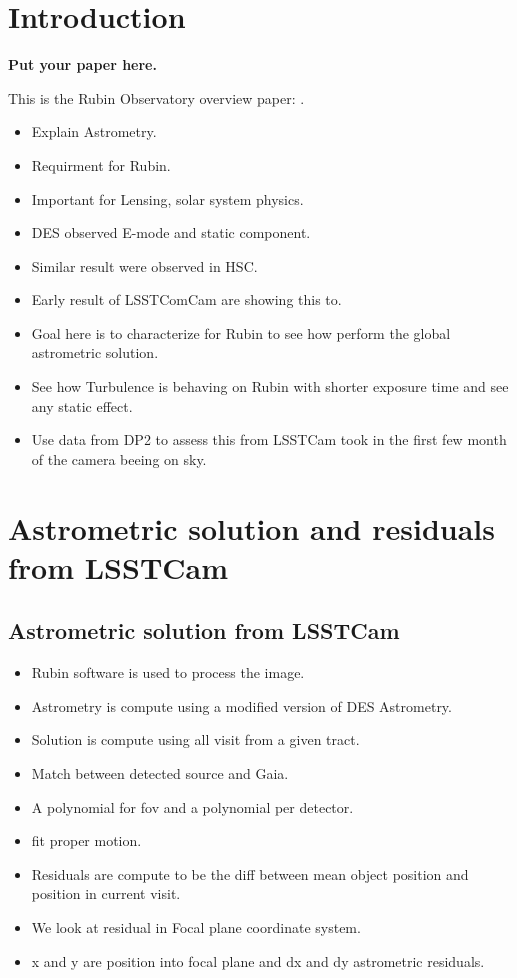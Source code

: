 \section{Introduction}

\textbf{Put your paper here.}
\vskip 0.4in

This is the Rubin Observatory overview paper: \citet{2019ApJ...873..111I}.

\begin{itemize}
    \item Explain Astrometry.
    \item Requirment for Rubin.
    \item Important for Lensing, solar system physics.
    \item DES observed E-mode and static component.
    \item Similar result were observed in HSC.
    \item Early result of LSSTComCam are showing this to. 
    \item Goal here is to characterize for Rubin to see how perform the global astrometric solution.
    \item See how Turbulence is behaving on Rubin with shorter exposure time and see any static effect.
    \item Use data from DP2 to assess this from LSSTCam took in the first few month of the camera beeing on sky.
\end{itemize}


\section{Astrometric solution and residuals from LSSTCam}

\subsection{Astrometric solution from LSSTCam}

\begin{itemize}
    \item Rubin software is used to process the image.
    \item Astrometry is compute using a modified version of DES Astrometry.
    \item Solution is compute using all visit from a given tract.
    \item Match between detected source and Gaia.
    \item A polynomial for fov and a polynomial per detector.
    \item fit proper motion.
    \item Residuals are compute to be the diff between mean object position and position in current visit.
    \item We look at residual in Focal plane coordinate system.
    \item x and y are position into focal plane and dx and dy astrometric residuals.
\end{itemize}

